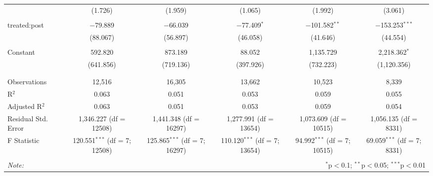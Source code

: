 \begin{table}[!htbp]
\begin{adjustbox}{width=\textwidth}
\begin{tabular}{@{\extracolsep{5pt}}lccccc}
  & (1.726) & (1.959) & (1.065) & (1.992) & (3.061) \\ 
  & & & & & \\ 
 treated:post & $-$79.889 & $-$66.039 & $-$77.409$^{*}$ & $-$101.582$^{**}$ & $-$153.253$^{***}$ \\ 
  & (88.067) & (56.897) & (46.058) & (41.646) & (44.554) \\ 
  & & & & & \\ 
 Constant & 592.820 & 873.189 & 88.052 & 1,135.729 & 2,218.362$^{*}$ \\ 
  & (641.856) & (719.136) & (397.926) & (732.223) & (1,120.356) \\ 
  & & & & & \\ 
\hline \\[-1.8ex] 
Observations & 12,516 & 16,305 & 13,662 & 10,523 & 8,339 \\ 
R$^{2}$ & 0.063 & 0.051 & 0.053 & 0.059 & 0.055 \\ 
Adjusted R$^{2}$ & 0.063 & 0.051 & 0.053 & 0.059 & 0.054 \\ 
Residual Std. Error & 1,346.227 (df = 12508) & 1,441.348 (df = 16297) & 1,277.991 (df = 13654) & 1,073.609 (df = 10515) & 1,056.135 (df = 8331) \\ 
F Statistic & 120.551$^{***}$ (df = 7; 12508) & 125.865$^{***}$ (df = 7; 16297) & 110.120$^{***}$ (df = 7; 13654) & 94.992$^{***}$ (df = 7; 10515) & 69.059$^{***}$ (df = 7; 8331) \\ 
\hline 
\hline \\[-1.8ex] 
\textit{Note:}  & \multicolumn{5}{r}{$^{*}$p$<$0.1; $^{**}$p$<$0.05; $^{***}$p$<$0.01} \\ 
\end{tabular}
\end{adjustbox}
\end{table} 
